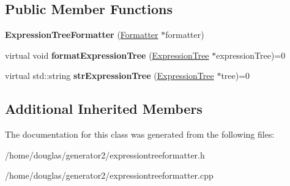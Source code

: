\subsection*{Public Member Functions}
\begin{DoxyCompactItemize}
\item 
{\bfseries Expression\+Tree\+Formatter} (\hyperlink{classFormatter}{Formatter} $\ast$formatter)\hypertarget{classExpressionTreeFormatter_a5fc08300c831caac6e2a3194ef78d9c9}{}\label{classExpressionTreeFormatter_a5fc08300c831caac6e2a3194ef78d9c9}

\item 
virtual void {\bfseries format\+Expression\+Tree} (\hyperlink{classExpressionTree}{Expression\+Tree} $\ast$expression\+Tree)=0\hypertarget{classExpressionTreeFormatter_aeadc86b321a5ee4eac522cd8ebe04b00}{}\label{classExpressionTreeFormatter_aeadc86b321a5ee4eac522cd8ebe04b00}

\item 
virtual std\+::string {\bfseries str\+Expression\+Tree} (\hyperlink{classExpressionTree}{Expression\+Tree} $\ast$tree)=0\hypertarget{classExpressionTreeFormatter_a5e832a625b7c58016c76377d2ad9b9c5}{}\label{classExpressionTreeFormatter_a5e832a625b7c58016c76377d2ad9b9c5}

\end{DoxyCompactItemize}
\subsection*{Additional Inherited Members}


The documentation for this class was generated from the following files\+:\begin{DoxyCompactItemize}
\item 
/home/douglas/generator2/expressiontreeformatter.\+h\item 
/home/douglas/generator2/expressiontreeformatter.\+cpp\end{DoxyCompactItemize}
